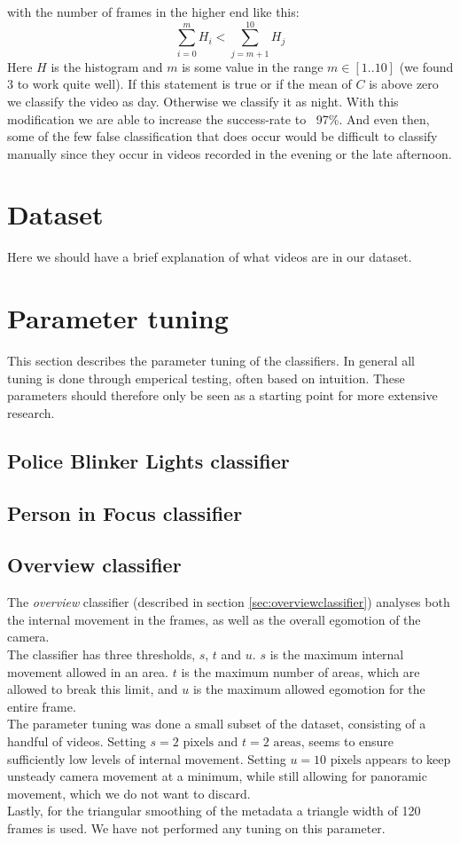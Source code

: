 %
with the number of frames in the higher end like this:
%
\begin{equation}
\sum_{i=0}^{m}H_{i} < \sum_{j=m+1}^{10}H_{j}
\end{equation}
%
%
%
Here $H$ is the histogram and $m$ is some value in the range $m\in [1..10]$ (we found $3$ to work quite well). If this statement is true or if the mean of $C$ is above zero we classify the video as day. Otherwise we classify it as night. With this modification we are able to increase the success-rate to ~97\%. And even then, some of the few false classification that does occur would be difficult to classify manually since they occur in videos recorded in the evening or the late afternoon.
%
\section{Dataset}
%
Here we should have a brief explanation of what videos are in our dataset.
%
\section{Parameter tuning}
%
This section describes the parameter tuning of the classifiers. In general all tuning is done through emperical testing, often based on intuition. These parameters should therefore only be seen as a starting point for more extensive research. 
%
\subsection{Police Blinker Lights classifier}
\subsection{Person in Focus classifier}
\subsection{Overview classifier}
%
The \textit{overview} classifier (described in section \ref{sec:overviewclassifier}) analyses both the internal movement in the frames, as well as the overall egomotion of the camera.\\
The classifier has three thresholds, $s$, $t$ and $u$. $s$ is the maximum internal movement allowed in an area. $t$ is the maximum number of areas, which are allowed to break this limit, and $u$ is the maximum allowed egomotion for the entire frame.\\
The parameter tuning was done a small subset of the dataset, consisting of a handful of videos. Setting $s = 2 \text{ pixels}$ and $t = 2 \text{ areas}$, seems to ensure sufficiently low levels of internal movement. Setting $u = 10 \text{ pixels}$ appears to keep unsteady camera movement at a minimum, while still allowing for panoramic movement, which we do not want to discard.\\
Lastly, for the triangular smoothing of the metadata a triangle width of 120 frames is used. We have not performed any tuning on this parameter.
%
